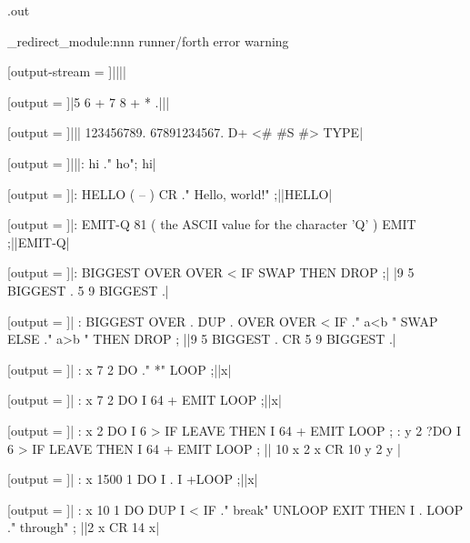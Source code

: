 \RequirePackage{runner}
\newcommand{\result}{}
\makeatletter
\newwrite \outfile
\immediate\openout\outfile \jobname.out

\ExplSyntaxOn
\msg_redirect_module:nnn { runner/forth } { error } { warning }
\ExplSyntaxOff

[output-stream = ]||||


[output = \result]|5 6 + 7 8 + * .|||
\typeout{\result}

[output = \result]|||
  123456789. 67891234567. D+ <# #S #> TYPE|
\typeout{\result}

[output = \result]|||: hi ." ho"; hi|
\typeout{\result}

[output = \result]|: HELLO  ( -- )  CR ." Hello, world!" ;||HELLO|
\typeout{\result}

[output = \result]|: EMIT-Q   81 ( the ASCII value for the character 'Q' ) EMIT ;||EMIT-Q|
\typeout{\result}

[output = \result]|: BIGGEST OVER OVER < IF SWAP THEN DROP ;|%
|9 5 BIGGEST . 5 9 BIGGEST .|
\typeout{\result}

[output = \result]|
  : BIGGEST OVER . DUP .
    OVER OVER < IF
      ." a<b " SWAP
    ELSE
      ." a>b "
    THEN
    DROP ;
||9 5 BIGGEST . CR 5 9 BIGGEST .|
\typeout{\result}

[output = \result]|
  : x 7 2 DO ." *" LOOP ;||x|
\typeout{\result}

[output = \result]|
  : x 7 2 DO I 64 + EMIT LOOP ;||x|
\typeout{\result}

[output = \result]|
  : x 2  DO I 6 > IF LEAVE THEN I 64 + EMIT LOOP ;
  : y 2 ?DO I 6 > IF LEAVE THEN I 64 + EMIT LOOP ;
||
  10 x 2 x CR
  10 y 2 y
|
\typeout{\result}

[output = \result]|
  : x 1500 1 DO I . I +LOOP ;||x|
\typeout{\result}

[output = \result]|
  : x 10 1 DO
  DUP I < IF ." break" UNLOOP EXIT THEN
  I .
  LOOP ." through" ;
||2 x CR 14 x|
\typeout{\result}

